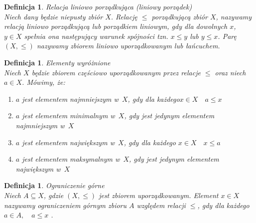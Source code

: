\documentclass[12pt,a4paper]{report}
\newtheorem{definition}[theorem]{Definicja}
\begin{document}
\begin{definition}{Relacja liniowo porządkująca (liniowy porządek) \cite[Rozdział 2]{blaszczyk2007}}\label{def-porzadek-liniowy}\\
Niech dany będzie niepusty zbiór $X$. Relację $\leq$ porządkującą zbiór $X$, nazywamy relacją liniowo porządkującą lub porządkiem liniowym, gdy dla dowolnych $x$, $y \in X$ spełnia ona następujący warunek spójności tzn. $x \leq y$ lub $y \leq x$. Parę $(X, \leq)$ nazywamy zbiorem liniowo uporządkowanym lub łańcuchem.
\end{definition}


\begin{definition}{Elementy wyróżnione \cite[Rozdział 2]{blaszczyk2007}}\\
Niech $X$ będzie zbiorem częściowo uporządkowanym przez relacje $\leq$ oraz niech $a \in X$. Mówimy, że:
\begin{enumerate}
\item $a$ jest elementem najmniejszym w~$X$, gdy dla każdego$x \in X \quad a \leq x$
\item $a$ jest elementem minimalnym w~$X$, gdy jest jedynym elementem najmniejszym w~$X$
\item $a$ jest elementem największym w~$X$, gdy dla każdego $ x \in X \quad x\leq a$
\item $a$ jest elementem maksymalnym w~$X$, gdy jest jedynym elementem największym w~$X$
\end{enumerate}

\end{definition}


\begin{definition}{Ograniczenie górne \cite[Rozdział 2]{blaszczyk2007}}\\
Niech $A \subseteq X$, gdzie $(X, \leq)$ jest zbiorem uporządkowanym. Element $x \in X$ nazywamy ograniczeniem górnym zbioru $A$ względem relacji $\leq$, gdy dla każdego $a \in A, \quad a \leq x$ . 
\end{definition}
\end{document}
